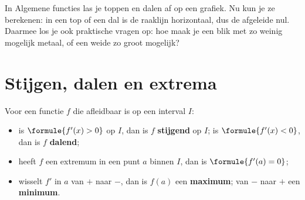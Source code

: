 %



In Algemene functies las je toppen en dalen af op een grafiek. Nu kun je ze berekenen: in een top of een dal is de raaklijn horizontaal, dus de afgeleide nul. Daarmee los je ook praktische vragen op: hoe maak je een blik met zo weinig mogelijk metaal, of een weide zo groot mogelijk?

\begin{oefeningen}[Start]

\end{oefeningen}

\section{Stijgen, dalen en extrema}

\begin{theorie}
Voor een functie $f$ die afleidbaar is op een interval $I$:
\begin{itemize}
\item is $\formule{f'(x) > 0}$ op $I$, dan is $f$ \textbf{\textcolor{accent}{stijgend}} op $I$; is $\formule{f'(x) < 0}$, dan is $f$ \textbf{\textcolor{accent}{dalend}};
\item heeft $f$ een extremum in een punt $a$ binnen $I$, dan is $\formule{f'(a) = 0}$;
\item wisselt $f'$ in $a$ van $+$ naar $-$, dan is $f(a)$ een \textbf{\textcolor{accent}{maximum}}; van $-$ naar $+$ een \textbf{\textcolor{accent}{minimum}}.
\end{itemize}
\end{theorie}

